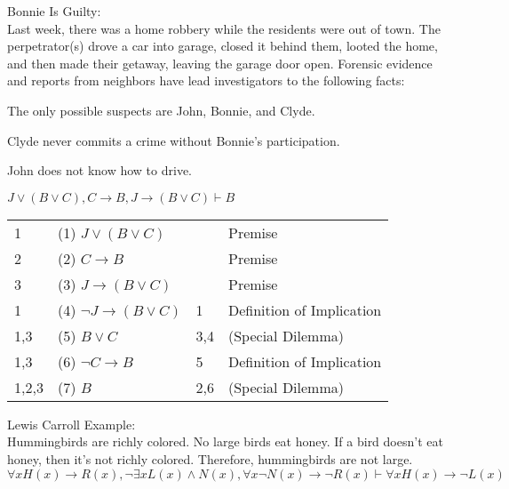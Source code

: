 \documentclass{article}
\theoremstyle{definition}
\begin{document}
\bigskip
\bigskip

\noindent
Bonnie Is Guilty: \\

\noindent
Last week, there was a home robbery while the residents were out of town.  The perpetrator(s) drove a car into garage, closed it behind them, looted the home, and then made their getaway, leaving the garage door open.  Forensic evidence and reports from neighbors have lead investigators to the following facts:\\
\begin{compactenum}
\item The only possible suspects are John, Bonnie, and Clyde.
\item Clyde never commits a crime without Bonnie's participation.
\item John does not know how to drive.\\
\end{compactenum}

$J \vee (B \vee C),C \to B,J \to (B \vee C) \vdash B$\\

\begin{tabular}{llll}
1 & (1) $J \vee (B \vee C)$ &  & Premise\\
2 & (2) $C \to B$ &  & Premise\\
3 & (3) $J \to (B \vee C)$ &  & Premise\\
1 & (4) $ \neg J \to (B \vee C)$ & 1 & Definition of Implication\\
1,3 & (5) $B \vee C$ & 3,4 & (Special Dilemma)\\
1,3 & (6) $ \neg C \to B$ & 5 & Definition of Implication\\
1,2,3 & (7) $B$ & 2,6 & (Special Dilemma)\\
\end{tabular}

\newpage

\noindent
Lewis Carroll Example: \\

\noindent
Hummingbirds are richly colored.  No large birds eat honey.  If a bird doesn't eat honey, then it's not richly colored.  Therefore, hummingbirds are not large.\\

$ \forall xH(x) \to R(x), \neg  \exists xL(x) \wedge N(x), \forall x \neg N(x) \to  \neg R(x) \vdash  \forall xH(x) \to  \neg L(x)$\\
\end{document}

